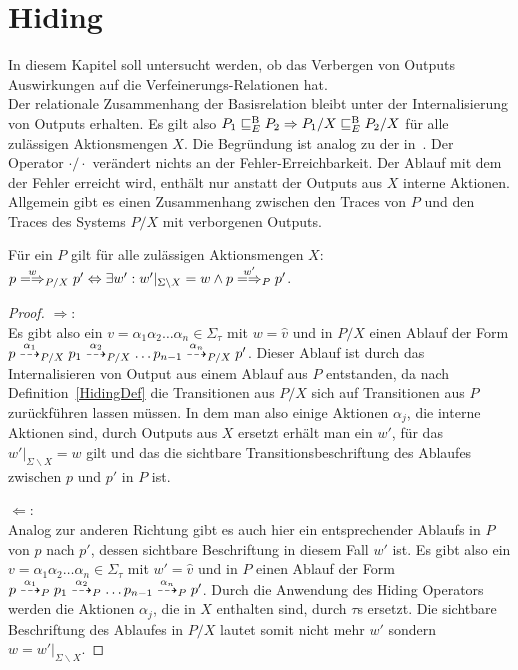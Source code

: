 \section{Hiding}

In diesem Kapitel soll untersucht werden, ob das Verbergen von Outputs
Auswirkungen auf die Verfeinerungs-Relationen \ERel{} hat.\\
Der relationale Zusammenhang der Basisrelation \EBRel{} bleibt unter der
Internalisierung von Outputs erhalten. Es gilt also $P_1 \sqsubseteq  _E^\mathrm{B} P_2 \Rightarrow
P_1/X \sqsubseteq  _E^\mathrm{B} P_2/X$ für alle zulässigen Aktionsmengen $X$. Die Begründung ist
analog zu der in~\cite{Schinko2016BA}. Der Operator $\cdot /\cdot$ verändert
nichts an der Fehler-Erreichbarkeit. Der Ablauf mit dem der Fehler erreicht
wird, enthält nur anstatt der Outputs aus $X$ interne Aktionen.\\
Allgemein gibt es einen Zusammenhang zwischen den Traces von $P$ und den Traces
des Systems $P/X$ mit verborgenen Outputs.

\begin{Lem}
  \label{TraceHidingLem}
  Für ein \MEIO{} $P$ gilt für alle zulässigen Aktionsmengen $X$: $p
  \weakmay[w]_{P/X} p' \Leftrightarrow \exists w': w'|_{\Sigma\backslash X} = w
  \land p \weakmay[w']_P p'$.
\end{Lem}
\begin{proof}
  \glqq $\Rightarrow$\grqq{}:\\
  Es gibt also ein $v=\alpha _1\alpha_2\dots\alpha _n\in\Sigma _{\tau}$ mit
  $w=\hat{v}$ und in $P/X$ einen Ablauf der Form $p \may[\alpha _1]_{P/X} p_1
  \may[\alpha _2]_{P/X} \dots p_{n-1} \may[\alpha _n]_{P/X} p'$. Dieser Ablauf
  ist durch das Internalisieren von Output aus einem Ablauf aus $P$ entstanden,
  da nach Definition~\ref{HidingDef} die Transitionen aus $P/X$ sich auf
  Transitionen aus $P$ zurückführen lassen müssen. In dem man also einige
  Aktionen $\alpha_j$, die interne Aktionen sind, durch Outputs aus $X$ ersetzt
  erhält man ein $w'$, für das $w'|_{\Sigma\backslash X}=w$ gilt und das die
  sichtbare Transitionsbeschriftung des Ablaufes zwischen $p$ und $p'$ in $P$
  ist.

  \glqq $\Leftarrow$\grqq{}:\\
  Analog zur anderen Richtung gibt es auch hier ein entsprechender Ablaufs in
  $P$ von $p$ nach $p'$, dessen sichtbare Beschriftung in diesem Fall $w'$ ist.
  Es gibt also ein $v=\alpha _1\alpha_2\dots\alpha _n\in\Sigma _{\tau}$ mit $w'
  = \hat{v}$ und in $P$ einen Ablauf der Form $p \may[\alpha _1]_P p_1
  \may[\alpha _2]_P \dots p_{n-1} \may[\alpha _n]_P p'$. Durch die Anwendung
  des Hiding Operators werden die Aktionen $\alpha _j$, die in $X$ enthalten
  sind, durch $\tau$s ersetzt. Die sichtbare Beschriftung des Ablaufes in $P/X$
  lautet somit nicht mehr $w'$ sondern $w = w'|_{\Sigma\backslash X}$.
\end{proof}

